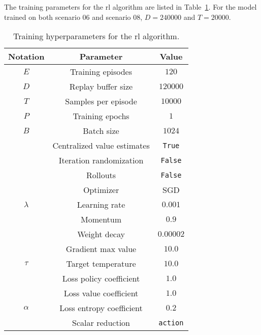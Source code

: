 The training parameters for the \gls{rl} algorithm are listed in Table~\ref{tab:training_hyperparams}. For the model trained on both scenario 06 and scenario 08, $D=240000$ and $T=20000$.
\begin{table}[H]
    \centering
    \begin{tabular}{c c c}
    \toprule
    \textbf{Notation} & \textbf{Parameter} & \textbf{Value}\\
    \toprule
    $E$ & Training episodes & $120$ \\
    $D$ & Replay buffer size & $120000$ \\
    $T$ & Samples per episode & $10000$ \\
    $P$ & Training epochs & $1$ \\
    $B$ & Batch size & $1024$ \\
     & Centralized value estimates & \texttt{True} \\
     & Iteration randomization & \texttt{False} \\
     & Rollouts & \texttt{False} \\
    & Optimizer & SGD \\
    $\lambda$ & Learning rate & $0.001$ \\
    & Momentum & $0.9$ \\
    & Weight decay & $0.00002$ \\
    & Gradient max value & $10.0$ \\
    $\tau$ & Target temperature & $10.0$ \\
    & Loss policy coefficient & $1.0$ \\
    & Loss value coefficient & $1.0$ \\
    $\alpha$ & Loss entropy coefficient & $0.2$ \\
    & Scalar reduction & \texttt{action} \\
    \toprule
    \end{tabular}
    \caption[Training hyperparameters for the RL algorithm]{Training hyperparameters for the \gls{rl} algorithm.}
    \label{tab:training_hyperparams}
\end{table}

